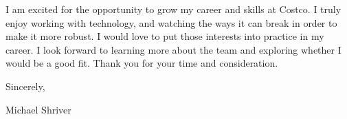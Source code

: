 \documentclass[10pt,oneside]{article}
\begin{document}
\vspace{\baselineskip}

I am excited for the opportunity to grow my career and skills at Costco. I truly enjoy working with technology, and watching the ways it can break in order to make it more robust. I would love to put those interests into practice in my career. I look forward to learning more about the team and exploring whether I would be a good fit. Thank you for your time and consideration.

\vspace{\baselineskip}

Sincerely,

\vspace{\baselineskip}

Michael Shriver
\end{document}
